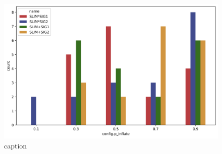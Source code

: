 
    \begin{figure}[h]
    \centering
    \includegraphics[width=\linewidth]{figures/countplot.png}
    \caption{caption}
    \label{fig:countplot}
    \end{figure}
    